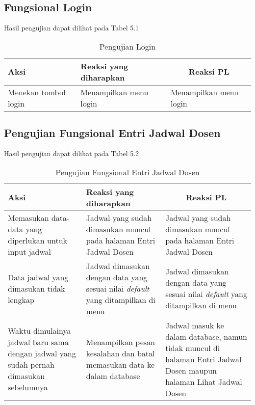 \subsection{Fungsional Login}
Hasil pengujian dapat dilihat pada Tabel 5.1
\begin{center}
	\begin{table}[H]
		\begin{tabular}{|p{5cm}|p{5cm}|p{5cm}|}
		\hline
		\centering Aksi	& 	\centering Reaksi yang diharapkan &  \multicolumn{1}{c|}{Reaksi PL} \\
		\hline
		Menekan tombol login & Menampilkan menu login & Menampilkan menu login \\
		\hline
		\end{tabular}
		\caption{Pengujian Login}
	\end{table}
\end{center}

\subsection{Pengujian Fungsional Entri Jadwal Dosen}
Hasil pengujian dapat dilihat pada Tabel 5.2
\begin{center}
	\begin{table}[H]
		\begin{tabular}{|p{5cm}|p{5cm}|p{5cm}|}
		\hline
		\centering Aksi	& 	\centering Reaksi yang diharapkan &  \multicolumn{1}{c|}{Reaksi PL} \\
		\hline
		Memasukan data-data yang diperlukan untuk input jadwal & Jadwal yang sudah dimasukan muncul pada halaman Entri Jadwal Dosen & Jadwal yang sudah dimasukan muncul pada halaman Entri Jadwal Dosen \\
		\hline
		Data jadwal yang dimasukan tidak lengkap & Jadwal dimasukan dengan data yang sesuai nilai \textit{default} yang ditampilkan di menu & Jadwal dimasukan dengan data yang sesuai nilai \textit{default} yang ditampilkan di menu \\
		\hline
		Waktu dimulainya jadwal baru sama dengan jadwal yang sudah pernah dimasukan sebelumnya & Menampilkan pesan kesalahan dan batal memasukan data ke dalam database & Jadwal masuk ke dalam database, namun tidak muncul di halaman Entri Jadwal Dosen maupun halaman Lihat Jadwal Dosen \\
		\hline
		\end{tabular}
		\caption{Pengujian Fungsional Entri Jadwal Dosen}
	\end{table}
\end{center}

